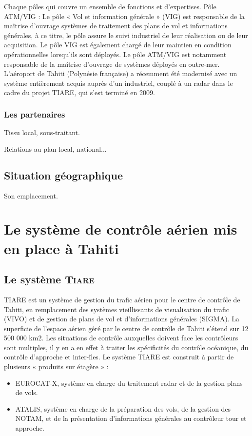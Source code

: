 Chaque pôles qui couvre un ensemble de fonctions et d’expertises.
Pôle ATM/VIG :
Le pôle « Vol et information générale » (VIG) est responsable de la maîtrise d’ouvrage systèmes de traitement des plans de vol et informations générales, à ce titre, le pôle assure le suivi industriel de leur réalisation ou de leur acquisition. Le pôle VIG est également chargé de leur maintien en condition opérationnelles lorsqu’ils sont déployés.
Le pôle ATM/VIG est notamment responsable de la maîtrise d’ouvrage de systèmes déployés en outre-mer. L’aéroport de Tahiti (Polynésie française) a récemment été modernisé avec un système entièrement acquis auprès d’un industriel, couplé à un radar dans le cadre du projet TIARE, qui s’est terminé en 2009.

    \subsubsection{Les partenaires}
        Tissu local, sous-traitant.
        
        Relations au plan local, national...

    \subsection{Situation géographique}
    
        Son emplacement.

\section[Contrôle aérien à Thaiti]{Le système de contrôle aérien mis en place à Tahiti}
    \subsection{Le système \textsc{Tiare}}
TIARE est un système de gestion du trafic aérien pour le centre de contrôle de Tahiti, en remplacement des systèmes vieillissants de visualisation du trafic (VIVO) et de gestion de plans de vol et d’informations générales (SIGMA). La superficie de l'espace aérien géré par le centre de contrôle de Tahiti s’étend sur 12 500 000 km2. Les situations de contrôle auxquelles doivent face les contrôleurs sont multiples, il y en a en effet à traiter les spécificités du contrôle océanique, du contrôle d’approche et inter-îles. Le système TIARE est construit à partir de plusieurs « produits sur étagère » :
\begin{itemize}
  \item EUROCAT-X, système en charge du traitement radar et de la gestion plans de vols.
  \item ATALIS, système en charge de la préparation des vols, de la gestion des NOTAM, et de la présentation d’informations générales au contrôleur tour et approche.
\end{itemize}

